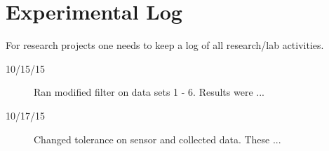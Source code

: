 

\chapter{Experimental Log}

For research projects one needs to keep a log of all research/lab activities.   


\begin{description}
\item [10/15/15]  Ran modified filter on data sets 1 - 6.  Results were ...
\item [10/17/15]  Changed tolerance on sensor and collected data.  These ...
\end{description}